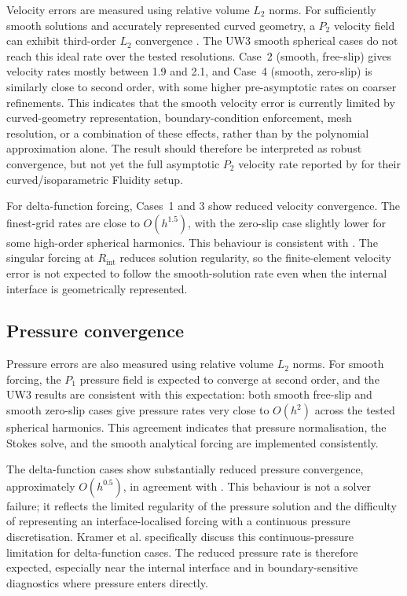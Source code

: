 \documentclass[11pt,a4paper]{article}
\begin{document}
Velocity errors are measured using relative volume \(L_2\) norms. For sufficiently smooth solutions and accurately represented curved geometry, a \(P_2\) velocity field can exhibit third-order \(L_2\) convergence \citep{girault1986,boffi2013}. The UW3 smooth spherical cases do not reach this ideal rate over the tested resolutions. Case~2 (smooth, free-slip) gives velocity rates mostly between 1.9 and 2.1, and Case~4 (smooth, zero-slip) is similarly close to second order, with some higher pre-asymptotic rates on coarser refinements. This indicates that the smooth velocity error is currently limited by curved-geometry representation, boundary-condition enforcement, mesh resolution, or a combination of these effects, rather than by the polynomial approximation alone. The result should therefore be interpreted as robust convergence, but not yet the full asymptotic \(P_2\) velocity rate reported by \citet{kramer2021} for their curved/isoparametric Fluidity setup.

For delta-function forcing, Cases~1 and 3 show reduced velocity convergence. The finest-grid rates are close to \(O(h^{1.5})\), with the zero-slip case slightly lower for some high-order spherical harmonics. This behaviour is consistent with \citet{kramer2021}. The singular forcing at \(R_{\mathrm{int}}\) reduces solution regularity, so the finite-element velocity error is not expected to follow the smooth-solution rate even when the internal interface is geometrically represented.

\subsection{Pressure convergence}

Pressure errors are also measured using relative volume \(L_2\) norms. For smooth forcing, the \(P_1\) pressure field is expected to converge at second order, and the UW3 results are consistent with this expectation: both smooth free-slip and smooth zero-slip cases give pressure rates very close to \(O(h^2)\) across the tested spherical harmonics. This agreement indicates that pressure normalisation, the Stokes solve, and the smooth analytical forcing are implemented consistently.

The delta-function cases show substantially reduced pressure convergence, approximately \(O(h^{0.5})\), in agreement with \citet{kramer2021}. This behaviour is not a solver failure; it reflects the limited regularity of the pressure solution and the difficulty of representing an interface-localised forcing with a continuous pressure discretisation. Kramer et al. specifically discuss this continuous-pressure limitation for delta-function cases. The reduced pressure rate is therefore expected, especially near the internal interface and in boundary-sensitive diagnostics where pressure enters directly.
\end{document}
